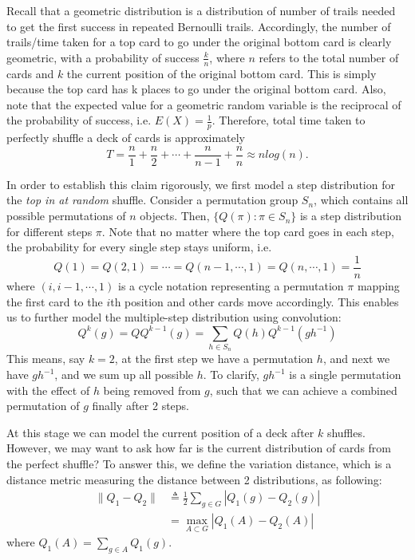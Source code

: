 \documentclass[12pt]{article}
\theoremstyle{plain}
\theoremstyle{definition}
\theoremstyle{remark}
\begin{document}
Recall that a geometric distribution is a distribution of number of trails needed to get the first success in repeated Bernoulli trails. Accordingly, the number of trails/time taken for a top card to go under the original bottom card is clearly geometric, with a probability of success $\frac{k}{n}$, where $n$ refers to the total number of cards and $k$ the current position of the original bottom card. This is simply because the top card has k places to go under the original bottom card. Also, note that the expected value for a geometric random variable is the reciprocal of the probability of success, i.e. $E(X)=\frac{1}{p}$. Therefore, total time taken to perfectly shuffle a deck of cards is approximately $$T = \frac{n}{1} + \frac{n}{2} + \cdots + \frac{n}{n-1} + \frac{n}{n} \approx nlog(n).$$

In order to establish this claim rigorously, we first model a step distribution for the \textit{top in at random} shuffle. Consider a permutation group $S_n$, which contains all possible permutations of $n$ objects. Then, $\{Q(\pi):\pi \in S_n\}$ is a step distribution for different steps $\pi$. Note that no matter where the top card goes in each step, the probability for every single step stays uniform, i.e.  $$Q(1)=Q(2,1)=\cdots=Q(n-1,\cdots,1)=Q(n,\cdots,1)=\frac{1}{n}$$ where $(i,i-1,\cdots,1)$ is a cycle notation representing a permutation $\pi$ mapping the first card to the $i$th position and other cards move accordingly. This enables us to further model the multiple-step distribution using convolution\cite[\pno~334]{1.1}: $$Q^k(g)=QQ^{k-1}(g)=\sum_{h\in S_n}Q(h)Q^{k-1}(gh^{-1})$$
This means, say $k=2$, at the first step we have a permutation $h$, and next we have $gh^{-1}$, and we sum up all possible $h$. To clarify, $gh^{-1}$ is a single permutation with the effect of $h$ being removed from $g$, such that we can achieve a combined permutation of $g$ finally after 2 steps.

At this stage we can model the current position of a deck after $k$ shuffles. However, we may want to ask how far is the current distribution of cards from the perfect shuffle? To answer this, we define the variation distance, which is a distance metric measuring the distance between 2 distributions, as following\cite[\pno~335]{1.1}:
\begin{equation*}
\begin{split}
    \|Q_1-Q_2\|&\triangleq \frac{1}{2}\sum_{g\in G}|Q_1(g)-Q_2(g)|\\
    &=\max_{A\subset G}|Q_1(A)-Q_2(A)|
\end{split}
\end{equation*}
where $Q_1(A)=\sum_{g\in A}Q_1(g)$.
\end{document}
